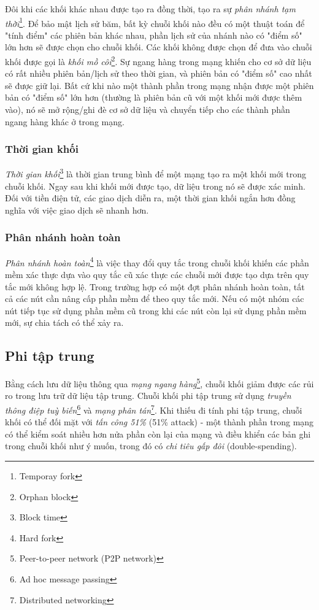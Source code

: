 Đôi khi các khối khác nhau được tạo ra đồng thời, tạo ra sự \textit{phân nhánh tạm thời}\footnote{Temporay fork}. Để bảo mật lịch sử băm, bất kỳ chuỗi khối nào đều có một thuật toán để "tính điểm" các phiên bản khác nhau, phần lịch sử của nhánh nào có "điểm số" lớn hơn sẽ được chọn cho chuỗi khối. Các khối không được chọn để đưa vào chuỗi khối được gọi là \textit{khối mồ côi}\footnote{Orphan block}. Sự ngang hàng trong mạng khiến cho cơ sở dữ liệu có rất nhiều phiên bản/lịch sử theo thời gian, và phiên bản có "điểm số" cao nhất sẽ được giữ lại. Bất cứ khi nào một thành phần trong mạng nhận được một phiên bản có "điểm số" lớn hơn (thường là phiên bản cũ với một khối mới được thêm vào), nó sẽ mở rộng/ghi đè cơ sở dữ liệu và chuyển tiếp cho các thành phần ngang hàng khác ở trong mạng.

\subsubsection{Thời gian khối}
\textit{Thời gian khối}\footnote{Block time} là thời gian trung bình để một mạng tạo ra một khối mới trong chuỗi khối. Ngay sau khi khối mới được tạo, dữ liệu trong nó sẽ được xác minh. Đối với tiền điện tử, các giao dịch diễn ra, một thời gian khối ngắn hơn đồng nghĩa với việc giao dịch sẽ nhanh hơn.

\subsubsection{Phân nhánh hoàn toàn}
\textit{Phân nhánh hoàn toàn}\footnote{Hard fork} là việc thay đổi quy tắc trong chuỗi khối khiến các phần mềm xác thực dựa vào quy tắc cũ xác thực các chuỗi mới được tạo dựa trên quy tắc mới không hợp lệ. Trong trường hợp có một đợt phân nhánh hoàn toàn, tất cả các nút cần nâng cấp phần mềm để theo quy tắc mới. Nếu có một nhóm các nút tiếp tục sử dụng phần mềm cũ trong khi các nút còn lại sử dụng phần mềm mới, sự chia tách có thể xảy ra.


\subsection{Phi tập trung}

Bằng cách lưu dữ liệu thông qua \textit{mạng ngang hàng}\footnote{Peer-to-peer network (P2P network)}, chuỗi khối giảm được các rủi ro trong lưu trữ dữ liệu tập trung. Chuỗi khối phi tập trung sử dụng \textit{truyền thông điệp tuỳ biến}\footnote{Ad hoc message passing} và \textit{mạng phân tán}\footnote{Distributed networking}. Khi thiếu đi tính phi tập trung, chuỗi khối có thể đối mặt với \textit{tấn công 51\%} (51\% attack) - một thành phần trong mạng có thể kiểm soát nhiều hơn nửa phần còn lại của mạng và điều khiển các bản ghi trong chuỗi khối như ý muốn, trong đó có \textit{chi tiêu gấp đôi} (double-spending).\\

